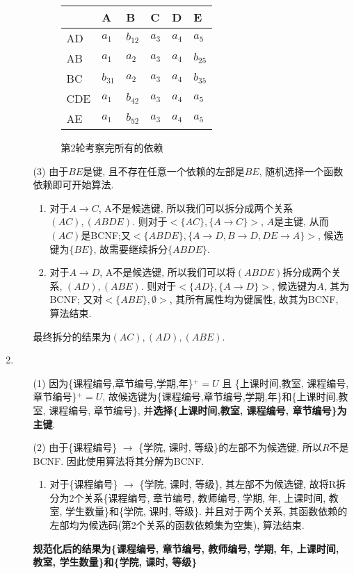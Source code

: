 \documentclass[10pt, a4paper]{article}
\begin{document}
\begin{enumerate}
\begin{enumerate}
\begin{figure}[H]
\begin{minipage}[b]{0.5\linewidth}
				\end{minipage}
				\begin{minipage}[b]{0.5\linewidth}
					\centering
					\begin{tabular}{|l|l|l|l|l|l|}
						\hline
							& A & B & C & D & E \\ \hline
						AD  & $a_1$ & $b_{12}$ & $a_3$  & $a_4$  & $a_5$  \\ \hline
						AB  & $a_1$ & $a_2$  & $a_3$  & $a_4$ & $b_{25}$  \\ \hline
						BC  & $b_{31}$ &  $a_2$ & $a_3$ & $a_4$ & $b_{35}$ \\ \hline
						CDE & $a_1$ & $b_{42}$ & $a_3$ & $a_4$ & $a_5$ \\ \hline
						AE  & $a_1$ & $b_{52}$ & $a_3$ & $a_4$ & $a_5$ \\ \hline
						\end{tabular}
						\caption{第2轮考察完所有的依赖}\label{tab:8}
				\end{minipage}
			\end{figure}
			
			\item[(3)] 由于$BE$是键, 且不存在任意一个依赖的左部是$BE$, 随机选择一个函数依赖即可开始算法.
			\begin{enumerate}
				\item 对于$A\to C$, A不是候选键, 所以我们可以拆分成两个关系$(AC), (ABDE)$. 则对于$<\{AC\}, \{A\to C\}>$, $A$是主键, 从而$(AC)$是BCNF;又$<\{ABDE\}, \{A\to D, B\to D, DE\to A\}>$, 候选键为$\{BE\}$, 故需要继续拆分$\{ABDE\}$.
				\item 对于$A\to D$, A不是候选键, 所以我们可以将$(ABDE)$拆分成两个关系, $(AD), (ABE)$. 则对于$<\{AD\}, \{A\to D\}>$, 候选键为$A$, 其为BCNF; 又对$<\{ABE\}, \emptyset >$, 其所有属性均为键属性, 故其为BCNF, 算法结束.
			\end{enumerate} 
			最终拆分的结果为$(AC), (AD), (ABE)$.
		\end{enumerate}
		\item \begin{enumerate}
			\item[(1)] 因为\{课程编号,章节编号,学期,年\}$^+ = U$ 且 \{上课时间,教室, 课程编号, 章节编号\}$^+ = U$, 故候选键为\{课程编号,章节编号,学期,年\}和\{上课时间,教室, 课程编号, 章节编号\}, 并\textbf{选择\{上课时间,教室, 课程编号, 章节编号\}为主键}.
			\item[(2)] 由于\{课程编号\} $\to$ \{学院, 课时, 等级\}的左部不为候选键, 所以$R$不是BCNF. 因此使用算法将其分解为BCNF.
			\begin{enumerate}
				\item 对于\{课程编号\} $\to$ \{学院, 课时, 等级\}, 其左部不为候选键, 故将R拆分为2个关系\{课程编号, 章节编号, 教师编号, 学期, 年, 上课时间, 教室, 学生数量\}和\{学院, 课时, 等级\}.
				并且对于两个关系, 其函数依赖的左部均为候选码(第2个关系的函数依赖集为空集), 算法结束.
			\end{enumerate} 
			\textbf{规范化后的结果为\{课程编号, 章节编号, 教师编号, 学期, 年, 上课时间, 教室, 学生数量\}和\{学院, 课时, 等级\}
}		\end{enumerate}
	\end{enumerate}
\end{document}
